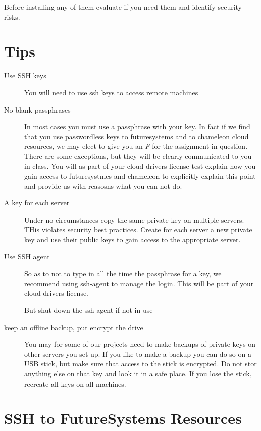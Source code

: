 Before installing any of them evaluate if you need them and identify
security risks.


\section{Tips}

\begin{description}

\item[Use SSH keys] You will need to use ssh keys to access remote machines

\item[No blank passphrases] In most cases you must use a passphrase
  with your key. In fact if we find that you use passwordless keys to
  futuresystems and to chameleon cloud resources, we may elect to give
  you an {\em F} for the assignment in question. There are some
  exceptions, but they will be clearly communicated to you in
  class. You will as part of your cloud drivers license test explain
  how you gain access to futuresystmes and chameleon to explicitly
  explain this point and provide us with reasosns what you can not do.

\item[A key for each server] Under no circumstances copy the same
  private key on multiple servers. THis violates security best
  practices. Create for each server a new private key and use their
  public keys to gain access to the appropriate server.

\item[Use SSH agent] So as to not to type in all the time the
  passphrase for a key, we recommend using ssh-agent to manage the
  login. This will be part of your cloud drivers license.

  But shut down the ssh-agent if not in use

\item[keep an offline backup, put encrypt the drive] You may for some
  of our projects need to make backups of private keys on other
  servers you set up. If you  like to make a backup you can do so on a
  USB stick, but make sure that access to the stick is encrypted. Do
  not stor anything else on that key and look it in a safe place. If
  you lose the stick, recreate all keys on all machines.

\end{description}


\section{SSH to FutureSystems Resources}

